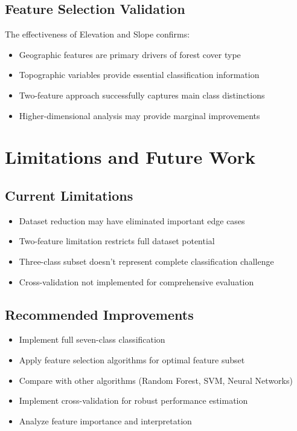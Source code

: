 \documentclass[12pt,a4paper]{article}
\begin{document}
\subsection{Feature Selection Validation}
The effectiveness of Elevation and Slope confirms:
\begin{itemize}
    \item Geographic features are primary drivers of forest cover type
    \item Topographic variables provide essential classification information
    \item Two-feature approach successfully captures main class distinctions
    \item Higher-dimensional analysis may provide marginal improvements
\end{itemize}

\section{Limitations and Future Work}

\subsection{Current Limitations}
\begin{itemize}
    \item Dataset reduction may have eliminated important edge cases
    \item Two-feature limitation restricts full dataset potential
    \item Three-class subset doesn't represent complete classification challenge
    \item Cross-validation not implemented for comprehensive evaluation
\end{itemize}

\subsection{Recommended Improvements}
\begin{itemize}
    \item Implement full seven-class classification
    \item Apply feature selection algorithms for optimal feature subset
    \item Compare with other algorithms (Random Forest, SVM, Neural Networks)
    \item Implement cross-validation for robust performance estimation
    \item Analyze feature importance and interpretation
\end{itemize}
\end{document}
